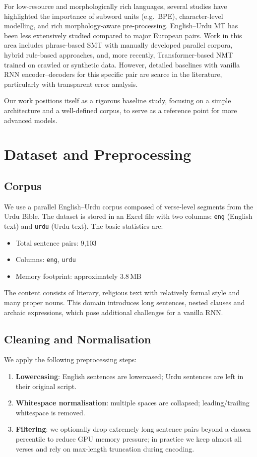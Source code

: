 \documentclass[runningheads]{llncs}
\begin{document}
For low-resource and morphologically rich languages, several studies have highlighted the importance of subword units (e.g.\ BPE), character-level modelling, and rich morphology-aware pre-processing.
English--Urdu MT has been less extensively studied compared to major European pairs.
Work in this area includes phrase-based SMT with manually developed parallel corpora, hybrid rule-based approaches, and, more recently, Transformer-based NMT trained on crawled or synthetic data.
However, detailed baselines with vanilla RNN encoder--decoders for this specific pair are scarce in the literature, particularly with transparent error analysis.

Our work positions itself as a rigorous baseline study, focusing on a simple architecture and a well-defined corpus, to serve as a reference point for more advanced models.

\section{Dataset and Preprocessing}
\subsection{Corpus}
We use a parallel English--Urdu corpus composed of verse-level segments from the Urdu Bible.
The dataset is stored in an Excel file with two columns: \texttt{eng} (English text) and \texttt{urdu} (Urdu text).
The basic statistics are:
\begin{itemize}
    \item Total sentence pairs: 9{,}103
    \item Columns: \texttt{eng}, \texttt{urdu}
    \item Memory footprint: approximately 3.8\,MB
\end{itemize}

The content consists of literary, religious text with relatively formal style and many proper nouns.
This domain introduces long sentences, nested clauses and archaic expressions, which pose additional challenges for a vanilla RNN.

\subsection{Cleaning and Normalisation}
We apply the following preprocessing steps:
\begin{enumerate}
    \item \textbf{Lowercasing}: English sentences are lowercased; Urdu sentences are left in their original script.
    \item \textbf{Whitespace normalisation}: multiple spaces are collapsed; leading/trailing whitespace is removed.
    \item \textbf{Filtering}: we optionally drop extremely long sentence pairs beyond a chosen percentile to reduce GPU memory pressure; in practice we keep almost all verses and rely on max-length truncation during encoding.
\end{enumerate}
\end{document}
